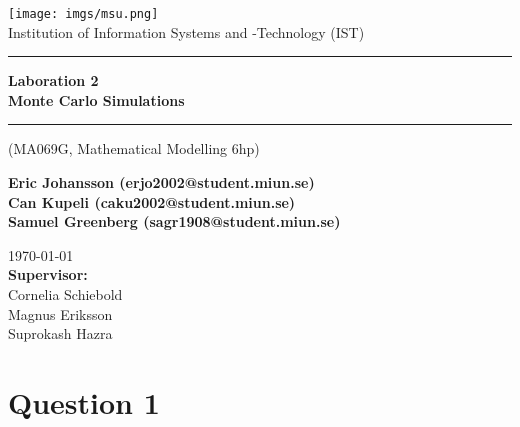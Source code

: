 \documentclass{article}
\makeatletter
\newcommand{\getauthor}{Eric Johansson (erjo2002@student.miun.se)\\Can Kupeli (caku2002@student.miun.se) \\Samuel Greenberg (sagr1908@student.miun.se)} %
\newcommand{\gettitle}{Laboration 2 \\Monte Carlo Simulations} %
\newcommand{\getcourse}{(MA069G, Mathematical Modelling 6hp)} %
\newcommand{\getsupervisor}{Cornelia Schiebold\\Magnus Eriksson\\Suprokash Hazra}
\makeatother
\begin{document}
\begin{titlepage}
	\begin{center}
		\vspace*{1cm}

		\texttt{[image: imgs/msu.png]}\\[0.5cm]
		\Large
		Institution of Information Systems and -Technology (IST)\\[1cm]
		\Huge
		\rule{\textwidth}{1px}
		\textbf{\gettitle}
		\rule[0.5cm]{\textwidth}{1px}

		\large
		\getcourse{}
		\vspace{1cm}

		\Large
		\textbf{\getauthor}\\

		\vfill


		\vspace{0.8cm}

		\small
		\today \\
		\Large
		\textbf{Supervisor:}\\
		\getsupervisor{}

	\end{center}
\end{titlepage}
\tableofcontents
\newpage
{}


\section{Question 1}
\end{document}
